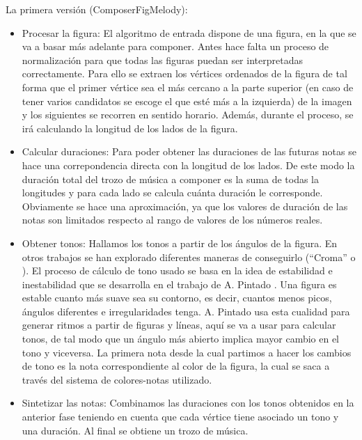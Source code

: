 La primera versión (ComposerFigMelody):
\begin{itemize}
	\item Procesar la figura: El algoritmo de entrada dispone de una figura, en la que se va a basar más adelante para componer. Antes hace falta un proceso de normalización para que todas las figuras puedan ser interpretadas correctamente. \color{blue} Para ello se extraen los vértices ordenados de la figura de tal forma que el primer vértice sea el más cercano a la parte superior (en caso de tener varios candidatos se escoge el que esté más a la izquierda) de la imagen y los siguientes se recorren en sentido horario\color{black}. Además, durante el proceso, se irá calculando la longitud de los lados de la figura.

	\item Calcular duraciones: Para poder obtener las duraciones de las futuras notas se hace una correpondencia directa con la longitud de los lados. De este modo la duración total del trozo de música a componer es la suma de todas la longitudes y para cada lado se calcula cuánta duración le corresponde. Obviamente se hace una aproximación, ya que los valores de duración de las notas son limitados respecto al rango de valores de los números reales.

	\item Obtener tonos: Hallamos los tonos a partir de los ángulos de la figura. En otros trabajos se han explorado diferentes maneras de conseguirlo (``Croma''\cite{bricksConvertsMusic} o \cite{ImageBaseComposition}). El proceso de cálculo de tono usado se basa en la idea de estabilidad e inestabilidad que se desarrolla en el trabajo de A. Pintado \cite{portutesis}. Una figura es estable cuanto más suave sea su contorno, es decir, cuantos menos picos, ángulos diferentes e irregularidades tenga. A. Pintado usa esta cualidad para generar ritmos a partir de figuras y líneas, aquí se va a usar para calcular tonos, de tal modo que un ángulo más abierto implica mayor cambio en el tono y viceversa. La primera nota desde la cual partimos a hacer los cambios de tono es la nota correspondiente al color de la figura, la cual se saca a través del sistema de colores-notas utilizado.

	\item Sintetizar las notas: Combinamos las duraciones con los tonos obtenidos en la anterior fase teniendo en cuenta que cada vértice tiene asociado un tono y una duración. Al final se obtiene un trozo de música.

\end{itemize}

